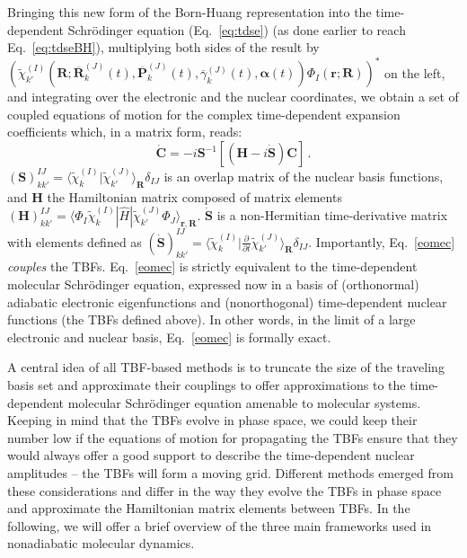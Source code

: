 \documentclass[9pt,bestpractices]{livecoms}
\newcommand{\bra}[1]{\langle #1|}
\newcommand{\ket}[1]{|#1\rangle}
\newcommand{\braket}[2]{\langle #1|#2\rangle}
\newcommand{\bs}{\mathbf}
\begin{document}
Bringing this new form of the Born-Huang representation into the time-dependent Schr\"{o}dinger equation (Eq.~\eqref{eq:tdse}) (as done earlier to reach Eq.~\eqref{eq:tdseBH}), multiplying both sides of the result by $\left(\tilde{\chi}_{k'}^{(I)}(\bs R;\overline{\bs R}_k^{(J)}(t),\overline{\bs P}_k^{(J)}(t),\overline{\gamma}_k^{(J)}(t),\bs \alpha(t)) \Phi_I(\bs r;\bs R)\right)^*$ on the left, and integrating over the electronic and the nuclear coordinates, we obtain a set of coupled equations of motion for the complex time-dependent expansion coefficients which, in a matrix form, reads:
\begin{equation}
\dot{\bs C}=-i\bs S^{-1}[(\bs H - i \dot{\bs S})\bs C] \, .
\label{eomec}
\end{equation}
$(\bs S)_{kk'}^{IJ}=\braket{\tilde{\chi}_k^{(I)}}{\tilde{\chi}_{k'}^{(J)}}_{\bs R}\delta_{IJ}$ is an overlap matrix of the nuclear basis functions, and $\bs H$ the Hamiltonian matrix composed of matrix elements $(\bs H)_{kk'}^{IJ}=\bra{\Phi_I\tilde{\chi}_k^{(I)}}\hat{H}\ket{\tilde{\chi}_{k'}^{(J)}\Phi_J}_{\bs r,\bs R}$. $\dot{\bs S}$ is a non-Hermitian time-derivative matrix with elements defined as $(\dot{\bs S})_{kk'}^{IJ}=\braket{\tilde{\chi}_k^{(I)}}{\frac{\partial}{\partial t}\tilde{\chi}_{k'}^{(J)}}_{\bs R}\delta_{IJ}$. Importantly, Eq.~\ref{eomec} \textit{couples} the TBFs.
Eq.~\eqref{eomec} is strictly equivalent to the time-dependent molecular Schr\"odinger equation, expressed now in a basis of (orthonormal) adiabatic electronic eigenfunctions and (nonorthogonal) time-dependent nuclear functions (the TBFs defined above). In other words, in the limit of a large electronic and nuclear basis,  Eq.~\eqref{eomec} is formally exact. 

A central idea of all TBF-based methods is to truncate the size of the traveling basis set and approximate their couplings to offer approximations to the time-dependent molecular Schr\"odinger equation amenable to molecular systems. Keeping in mind that the TBFs evolve in phase space, we could keep their number low if the equations of motion for propagating the TBFs ensure that they would always offer a good support to describe the time-dependent nuclear amplitudes -- the TBFs will form a moving grid. Different methods emerged from these considerations and differ in the way they evolve the TBFs in phase space and approximate the Hamiltonian matrix elements between TBFs. In the following, we will offer a brief overview of the three main frameworks used in nonadiabatic molecular dynamics. 
\end{document}
